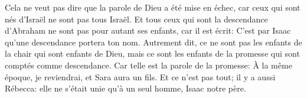 Cela ne veut pas dire que la parole de Dieu a été mise en échec,
	car ceux qui sont nés d’Israël ne sont pas tous Israël.
Et tous ceux qui sont la descendance d’Abraham
	ne sont pas pour autant ses enfants, car il est écrit:
	C’est par Isaac qu’une descendance portera ton nom.
Autrement dit, ce ne sont pas les enfants de la chair qui sont enfants de Dieu,
	mais ce sont les enfants de la promesse qui sont comptés comme descendance.
Car telle est la parole de la promesse:
	À la même époque, je reviendrai, et Sara aura un fils.
Et ce n’est pas tout; il y a aussi Rébecca:
	elle ne s’était unie qu’à un seul homme, Isaac notre père.
